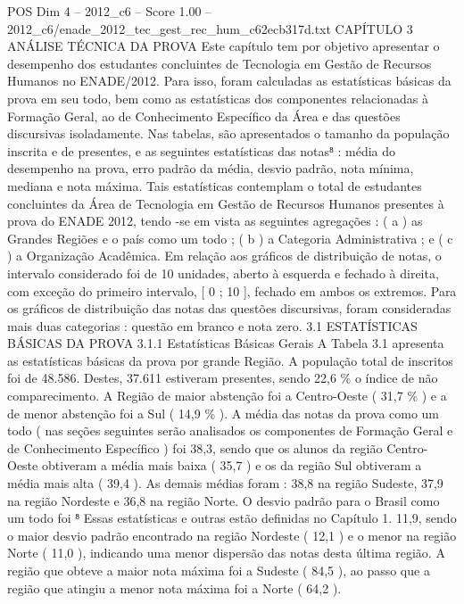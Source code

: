 \begin{textsample}{POS Dim 4 – 2012\_c6 – Score 1.00 – 2012\_c6/enade\_2012\_tec\_gest\_rec\_hum\_c62ecb317d.txt}  \label{ex:f4_pos_128}
CAPÍTULO 3 ANÁLISE TÉCNICA DA PROVA Este capítulo tem por objetivo apresentar o desempenho dos estudantes concluintes de Tecnologia em Gestão de Recursos Humanos no ENADE/2012.
Para isso, foram calculadas as estatísticas básicas da prova em seu todo, bem como as estatísticas dos componentes relacionadas à Formação Geral, ao de Conhecimento Específico da Área e das questões discursivas isoladamente.
Nas tabelas, são apresentados o tamanho da população inscrita e de presentes, e as seguintes estatísticas das notas⁸ : média do desempenho na prova, erro padrão da média, desvio padrão, nota mínima, mediana e nota máxima.
Tais estatísticas contemplam o total de estudantes concluintes da Área de Tecnologia em Gestão de Recursos Humanos presentes à prova do ENADE 2012, tendo -se em vista as seguintes agregações : ( a ) as Grandes Regiões e o país como um todo ; ( b ) a Categoria Administrativa ; e ( c ) a Organização Acadêmica.
Em relação aos gráficos de distribuição de notas, o intervalo considerado foi de 10 unidades, aberto à esquerda e fechado à direita, com exceção do primeiro intervalo, [ 0 ; 10 ], fechado em ambos os extremos.
Para os gráficos de distribuição das notas das questões discursivas, foram consideradas mais duas categorias : questão em branco e nota zero. 3.1 ESTATÍSTICAS BÁSICAS DA PROVA 3.1.1 Estatísticas Básicas Gerais A Tabela 3.1 apresenta as estatísticas básicas da prova por grande Região.
A população total de inscritos foi de 48.586.
Destes, 37.611 estiveram presentes, sendo 22,6 \% o índice de não comparecimento.
A Região de maior abstenção foi a Centro-Oeste ( 31,7 \% ) e a de menor abstenção foi a Sul ( 14,9 \% ).
A média das notas da prova como um todo ( nas seções seguintes serão analisados os componentes de Formação Geral e de Conhecimento Específico ) foi 38,3, sendo que os alunos da região Centro-Oeste obtiveram a média mais baixa ( 35,7 ) e os da região Sul obtiveram a média mais alta ( 39,4 ).
As demais médias foram : 38,8 na região Sudeste, 37,9 na região Nordeste e 36,8 na região Norte.
O desvio padrão para o Brasil como um todo foi ⁸ Essas estatísticas e outras estão definidas no Capítulo 1. 11,9, sendo o maior desvio padrão encontrado na região Nordeste ( 12,1 ) e o menor na região Norte ( 11,0 ), indicando uma menor dispersão das notas desta última região.
A região que obteve a maior nota máxima foi a Sudeste ( 84,5 ), ao passo que a região que atingiu a menor nota máxima foi a Norte ( 64,2 ).

\end{textsample}
